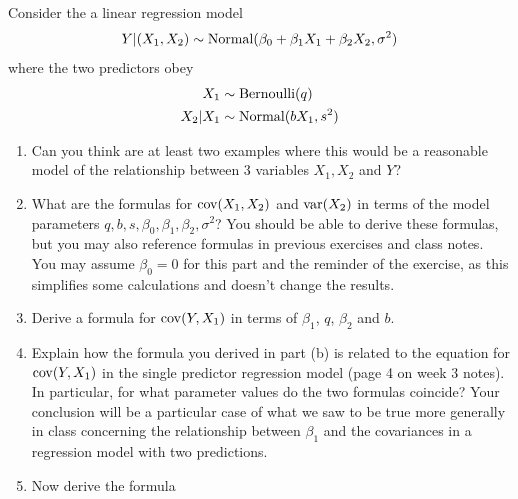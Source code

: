 \begin{exercise}\label{ex:binnorm}
Consider the a linear regression model 
\begin{equation*}
Y|(X_1,X_2) \sim {\rm Normal}(\beta_0 + \beta_1X_1 + \beta_2X_2,\sigma^2)
\end{equation*}
 where the two predictors obey
\begin{align*}
X_1 &\sim {\rm Bernoulli}(q)\\
X_2|X_1 &\sim {\rm Normal}(bX_1,s^2)
\end{align*}
\begin{enumerate}[label=(\alph*)]
\item Can you think are at least two examples where this would be a reasonable model of the relationship between $3$ variables $X_1,X_2$ and $Y$? 
\item What are the formulas for ${\rm cov}(X_1,X_2)$ and ${\rm var}(X_2)$ in terms of the model parameters $q,b,s,\beta_0,\beta_1,\beta_2,\sigma^2$? You should be able to derive these formulas, but you may also reference formulas in previous exercises and class notes. You may assume $\beta_0 = 0$ for this part and the reminder of the exercise, as this simplifies some calculations and doesn't change the results. 
\item Derive a formula for ${\rm cov}(Y,X_1)$ in terms of $\beta_1$, $q$, $\beta_2$ and $b$.  
\item Explain how the formula you derived in part (b) is related to the equation for ${\rm cov}(Y,X_1)$ in the single predictor regression model (page 4 on week 3 notes). In particular, for what parameter values do the two formulas coincide? Your conclusion will be a particular case of what we saw to be true more generally in class concerning the relationship between $\beta_1$ and the covariances in a regression model with two predictions. 
\item Now derive the formula
\begin{equation*}

\end{equation*}
\end{enumerate}
\end{exercise}
